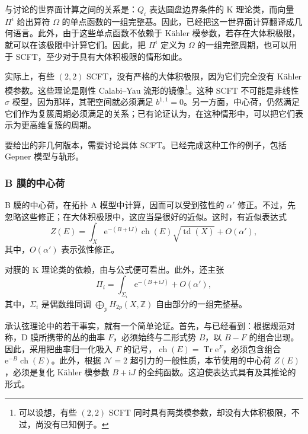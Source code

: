 与讨论的世界面计算之间的关系是：$Q_i$ 表达圆盘边界条件的 K 理论类，而向量 $\Pi^i$ 给出算符 $\Omega$ 的单点函数的一组完整基。因此，已经把这一世界面计算翻译成几何语言。此外，由于这些单点函数不依赖于 K\"ahler 模参数，若存在大体积极限，就可以在该极限中计算它们。因此，把 $\Pi^i$ 定义为 $\Omega$ 的一组完整周期，也可以用于 SCFT，至少对于具有大体积极限的情形如此。

实际上，有些 $(2,2)$ SCFT，没有严格的大体积极限，因为它们完全没有 K\"ahler 模参数。这些理论是刚性 Calabi--Yau 流形的镜像\footnote{可以设想，有些 $(2,2)$ SCFT 同时具有两类模参数，却没有大体积极限，不过，尚没有已知例子。}。这种 SCFT 不可能是非线性 $\sigma$ 模型，因为那样，其靶空间就必须满足 $b^{1,1}=0$。另一方面，中心荷，仍然满足它们作为复簇周期必须满足的关系；已有论证认为，在这种情形中，可以把它们表示为更高维复簇的周期。

要给出的非几何版本，需要讨论具体 SCFT。已经完成这种工作的例子，包括 Gepner 模型与轨形。

\subsubsection{B 膜的中心荷}\label{sec:5.3.5.5}

B 膜的中心荷，在拓扑 A 模型中计算，因而可以受到弦性的 $\alpha'$ 修正。不过，先忽略这些修正；在大体积极限中，这应当是很好的近似。这时，有近似表达式
\begin{equation}\label{eq:5.71}
Z(E)=\int_X\mathrm{e}^{-(B+\mathrm{i}J)}
\operatorname{ch}(E)\sqrt{\operatorname{td}(X)}+O(\alpha'),
\end{equation}
其中，$O(\alpha')$ 表示弦性修正。

对膜的 K 理论类的依赖，由与公式便可看出。此外，还主张
\begin{equation}\label{eq:5.72}
\Pi_i=\int_{\Sigma_i}\mathrm{e}^{-(B+\mathrm{i}J)}+O(\alpha'),
\end{equation}
其中，$\Sigma_i$ 是偶数维同调 $\bigoplus_pH_{2p}(X,\mathbb{Z})$ 自由部分的一组完整基。

承认弦理论中的若干事实，就有一个简单论证。首先，与已经看到：根据规范对称，D 膜所携带的丛的曲率 $F$，必须始终与二形式势 $B$，以 $B-F$ 的组合出现。因此，采用把曲率归一化吸入 $F$ 的记号，$\operatorname{ch}(E)=\operatorname{Tr}\mathrm{e}^F$，必须包含组合 $\mathrm{e}^{-B}\operatorname{ch}(E)$。此外，根据 $\mathcal{N}=2$ 超引力的一般性质，本节使用的中心荷 $Z(E)$，必须是复化 K\"ahler 模参数 $B+\mathrm{i}J$ 的全纯函数。这迫使表达式具有及其推论的形式。

